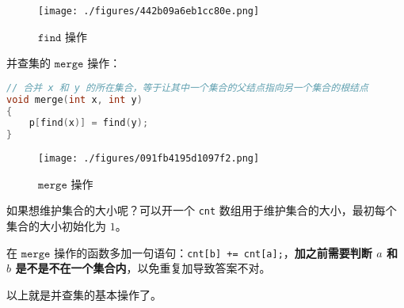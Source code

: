\begin{figure}[ht]
\centering
\texttt{[image: ./figures/442b09a6eb1cc80e.png]}
\caption{$\mathtt{find}$ 操作} \label{fig_DSU_1}
\end{figure}

并查集的 $\mathtt{merge}$ 操作：
\begin{lstlisting}[language=cpp]
// 合并 x 和 y 的所在集合，等于让其中一个集合的父结点指向另一个集合的根结点
void merge(int x, int y)
{
    p[find(x)] = find(y);
}
\end{lstlisting}


\begin{figure}[ht]
\centering
\texttt{[image: ./figures/091fb4195d1097f2.png]}
\caption{$\mathtt{merge}$ 操作} \label{fig_DSU_2}
\end{figure}

如果想维护集合的大小呢？可以开一个 \verb|cnt| 数组用于维护集合的大小，最初每个集合的大小初始化为 $1$。

在 $\mathtt{merge}$ 操作的函数多加一句语句：\verb|cnt[b] += cnt[a];|，\textbf{加之前需要判断 $a$ 和 $b$ 是不是不在一个集合内}，以免重复加导致答案不对。


以上就是并查集的基本操作了。
